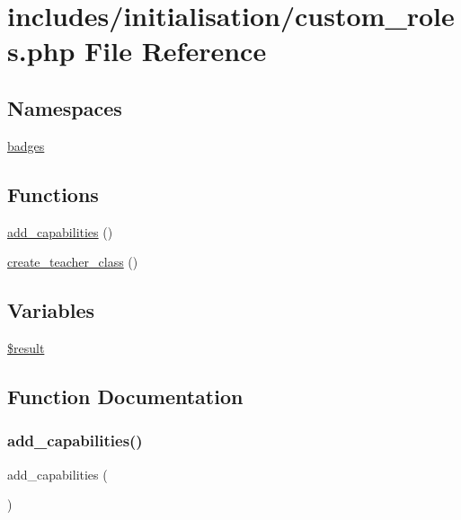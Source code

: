 \hypertarget{custom__roles_8php}{}\section{includes/initialisation/custom\+\_\+roles.php File Reference}
\label{custom__roles_8php}
\subsection*{Namespaces}
\begin{DoxyCompactItemize}
\item 
 \hyperlink{namespacebadges}{badges}
\end{DoxyCompactItemize}
\subsection*{Functions}
\begin{DoxyCompactItemize}
\item 
\hyperlink{custom__roles_8php_a314f5cc3e850ad6fbb30f062ec15f2fe}{add\+\_\+capabilities} ()
\item 
\hyperlink{custom__roles_8php_acc11267bda16eb7c740c9b4a84cee25f}{create\+\_\+teacher\+\_\+class} ()
\end{DoxyCompactItemize}
\subsection*{Variables}
\begin{DoxyCompactItemize}
\item 
\hyperlink{custom__roles_8php_a112ef069ddc0454086e3d1e6d8d55d07}{\$result}
\end{DoxyCompactItemize}


\subsection{Function Documentation}
\mbox{\label{custom__roles_8php_a314f5cc3e850ad6fbb30f062ec15f2fe}} 
\subsubsection{\texorpdfstring{add\+\_\+capabilities()}{add\_capabilities()}}
{\footnotesize\ttfamily add\+\_\+capabilities (\begin{DoxyParamCaption}{ }\end{DoxyParamCaption})}



